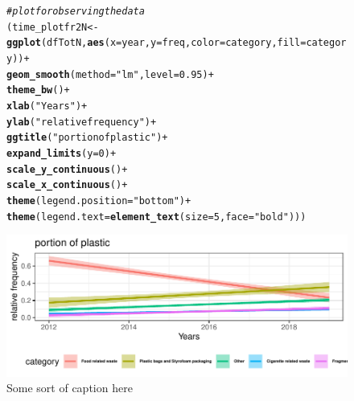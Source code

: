 \documentclass[10pt]{article}\usepackage[]{graphicx}\usepackage[]{color}
\makeatletter
\newcommand{\hlnum}[1]{\textcolor[rgb]{0.686,0.059,0.569}{#1}}%
\newcommand{\hlstr}[1]{\textcolor[rgb]{0.192,0.494,0.8}{#1}}%
\newcommand{\hlcom}[1]{\textcolor[rgb]{0.678,0.584,0.686}{\textit{#1}}}%
\newcommand{\hlopt}[1]{\textcolor[rgb]{0,0,0}{#1}}%
\newcommand{\hlstd}[1]{\textcolor[rgb]{0.345,0.345,0.345}{#1}}%
\newcommand{\hlkwb}[1]{\textcolor[rgb]{0.69,0.353,0.396}{#1}}%
\newcommand{\hlkwc}[1]{\textcolor[rgb]{0.333,0.667,0.333}{#1}}%
\newcommand{\hlkwd}[1]{\textcolor[rgb]{0.737,0.353,0.396}{\textbf{#1}}}%
\newenvironment{kframe}{%
 \def\at@end@of@kframe{}%
 \ifinner\ifhmode%
  \def\at@end@of@kframe{\end{minipage}}%
  \begin{minipage}{\columnwidth}%
 \fi\fi%
 \def\FrameCommand##1{\hskip\@totalleftmargin \hskip-\fboxsep
 \colorbox{shadecolor}{##1}\hskip-\fboxsep
     \hskip-\linewidth \hskip-\@totalleftmargin \hskip\columnwidth}%
 \MakeFramed {\advance\hsize-\width
   \@totalleftmargin\z@ \linewidth\hsize
   \@setminipage}}%
 {\par\unskip\endMakeFramed%
 \at@end@of@kframe}
\newenvironment{knitrout}{}{} %
\makeatother
\begin{document}
\begin{figure}[H] %
\begin{center}
\begin{knitrout}\small
{}\color{fgcolor}\begin{kframe}
\begin{alltt}
\hlcom{# plot for observing the data}
\hlstd{(time_plotfr2N} \hlkwb{<-} \hlkwd{ggplot}\hlstd{(dfTotN,} \hlkwd{aes}\hlstd{(}\hlkwc{x} \hlstd{= year,} \hlkwc{y} \hlstd{= freq,} \hlkwc{color}\hlstd{=category,} \hlkwc{fill} \hlstd{= category))} \hlopt{+}
  \hlkwd{geom_smooth}\hlstd{(}\hlkwc{method}\hlstd{=}\hlstr{"lm"}\hlstd{,} \hlkwc{level}\hlstd{=}\hlnum{0.95}\hlstd{)} \hlopt{+}
  \hlkwd{theme_bw}\hlstd{()} \hlopt{+}
  \hlkwd{xlab}\hlstd{(}\hlstr{"Years"}\hlstd{)} \hlopt{+}
  \hlkwd{ylab}\hlstd{(}\hlstr{"relative frequency"}\hlstd{)} \hlopt{+}
  \hlkwd{ggtitle}\hlstd{(}\hlstr{"portion of plastic"}\hlstd{)} \hlopt{+}
  \hlkwd{expand_limits}\hlstd{(}\hlkwc{y}\hlstd{=}\hlnum{0}\hlstd{)} \hlopt{+}
  \hlkwd{scale_y_continuous}\hlstd{()} \hlopt{+}
  \hlkwd{scale_x_continuous}\hlstd{()}\hlopt{+}
  \hlkwd{theme}\hlstd{(}\hlkwc{legend.position}\hlstd{=}\hlstr{"bottom"}\hlstd{)}\hlopt{+}
  \hlkwd{theme}\hlstd{(}\hlkwc{legend.text} \hlstd{=} \hlkwd{element_text}\hlstd{(}\hlkwc{size}\hlstd{=}\hlnum{5}\hlstd{,} \hlkwc{face}\hlstd{=}\hlstr{"bold"}\hlstd{)))}
\end{alltt}
\end{kframe}
\includegraphics[width=1\linewidth]{figure/unnamed-chunk-20-1} 

\end{knitrout}
\caption {Some sort of caption here}
\label{figG1}
\end {center}
\end {figure}
\end{document}
